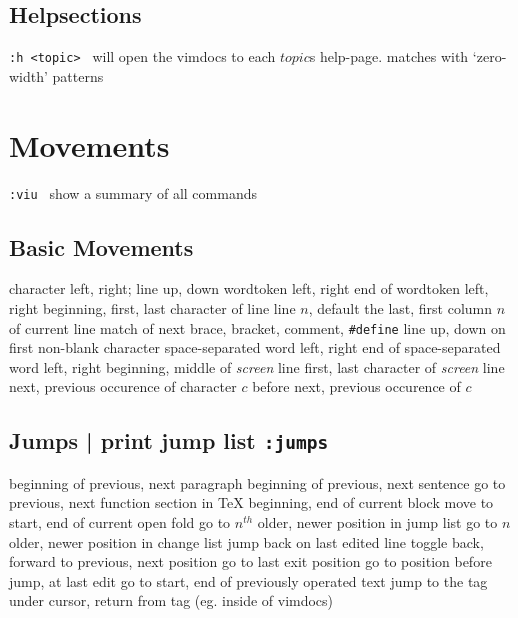 
\def\content{\uppercase{vim}}
\def\shortcontent{\content}
\def\versionnumber{1.5}  %
\def\version{v\versionnumber\ \month\ \year}


\mytitle

\shortintro
\shortintroVim

\subsection{Helpsections}	{{\tt :h <topic> } will open the vimdocs to each $topic$s help-page. }
	{matches with `zero-width'  patterns}

\section{Movements}	{{\tt :viu } show a summary of all commands }
\subsection{Basic Movements}{}
	{character left, right; line up, down }
	{word\or token left, right }
	{end of word\or token left, right}
	{beginning, first, last character of line}
	{line $n$, default the last, first}
	{column $n$ of current line}
\cmdS{\% }	{match of next brace, bracket, comment, {\tt\#define}}
\cmdS{- + }	{line up, down on first non-blank character}
	{space-separated word left, right}
	{end of space-separated word left, right}
	{beginning, middle of {\it screen\/} line}
	{first, last character of {\it screen\/} line}
	{next, previous occurence of character $c$}
	{before next, previous occurence of $c$}

\subsection{Jumps | {print jump list {\tt :jumps}}}	{}
\cmdS{\lapos\ \rapos }	{beginning of previous, next paragraph}
\cmdS{( ) }	{beginning of previous, next sentence}
\cmdS{[[\ ]]}	{go to previous, next function \or \bs section in \TeX}
\cmdS{[\lapos\ ]\rapos}	{beginning, end of current block}
	{move to start, end of current open fold}
	{go to $n^{th}$ older, newer position in jump list}
	{go to $n$ older, newer position in change list}
	{jump back on last edited line}
	{toggle back, forward to previous, next position}
	{go to last exit position}
	{go to position before jump, at last edit}
	{go to start, end of previously operated text}
\cmdS{\ctrl ] \ctrl T }	{jump to the tag under cursor, return from tag (eg. inside of vimdocs)}

